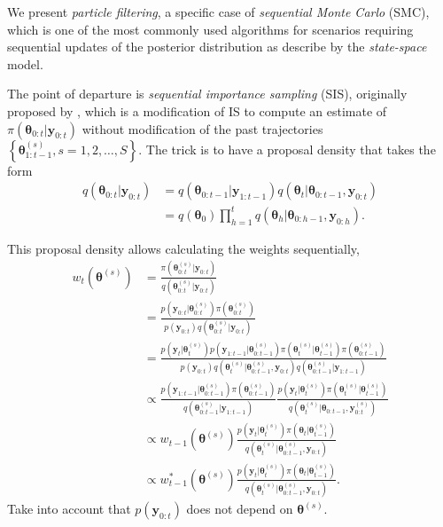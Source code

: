 We present \textit{particle filtering}, a specific case of \textit{sequential Monte Carlo} (SMC), which is one of the most commonly used algorithms for scenarios requiring sequential updates of the posterior distribution as describe by the \textit{state-space} model. 

The point of departure is \textit{sequential importance sampling} (SIS), originally proposed by \cite{handschin1969monte}, which is a modification of IS to compute an estimate of $\pi(\bm{\theta}_{0:t}|\bm{y}_{0:t})$ without modification of the past trajectories $\left\{\bm{\theta}^{(s)}_{1:t-1}, s=1,2,\dots,S\right\}$. The trick is to have a proposal density that takes the form 
\begin{align*}
	q(\bm{\theta}_{0:t}|\bm{y}_{0:t}) &= q(\bm{\theta}_{0:t-1}|\bm{y}_{1:t-1})q(\bm{\theta}_t|\bm{\theta}_{0:t-1},\bm{y}_{0:t}) \\
	&= q(\bm{\theta}_0)\prod_{h=1}^{t}q(\bm{\theta}_h|\bm{\theta}_{0:h-1},\bm{y}_{0:h}).
\end{align*}

This proposal density allows calculating the weights sequentially,
\begin{align*}
	w_{t}(\bm{\theta}^{(s)})&=\frac{\pi(\bm{\theta}_{0:t}^{(s)}|\bm{y}_{0:t})}{q(\bm{\theta}_{0:t}^{(s)}|\bm{y}_{0:t})}\\
	&=\frac{p(\bm{y}_{0:t}|\bm{\theta}_{0:t}^{(s)})\pi(\bm{\theta}_{0:t}^{(s)})}{p(\bm{y}_{0:t})q(\bm{\theta}_{0:t}^{(s)}|\bm{y}_{0:t})}\\
	&=\frac{p(\bm{y}_{t}|\bm{\theta}_{t}^{(s)})p(\bm{y}_{1:t-1}|\bm{\theta}_{0:t-1}^{(s)})\pi(\bm{\theta}_{t}^{(s)}|\bm{\theta}_{t-1}^{(s)})\pi(\bm{\theta}_{0:t-1}^{(s)})}{p(\bm{y}_{0:t})q(\bm{\theta}_{t}^{(s)}|\bm{\theta}_{0:t-1}^{(s)},\bm{y}_{0:t})q(\bm{\theta}_{0:t-1}^{(s)}|\bm{y}_{1:t-1})}\\
	&\propto\frac{p(\bm{y}_{1:t-1}|\bm{\theta}_{0:t-1}^{(s)})\pi(\bm{\theta}_{0:t-1}^{(s)})}{q(\bm{\theta}_{0:t-1}^{(s)}|\bm{y}_{1:t-1})}\frac{p(\bm{y}_{t}|\bm{\theta}_{t}^{(s)})\pi(\bm{\theta}_{t}^{(s)}|\bm{\theta}_{t-1}^{(s)})}{q(\bm{\theta}_{t}^{(s)}|\bm{\theta}_{0:t-1},\bm{y}_{0:t}^{(s)})}\\
	&\propto w_{t-1}(\bm{\theta}^{(s)})\frac{p(\bm{y}_{t}|\bm{\theta}_{t}^{(s)})\pi(\bm{\theta}_{t}|\bm{\theta}_{t-1}^{(s)})}{q(\bm{\theta}_t^{(s)}|\bm{\theta}_{0:t-1}^{(s)},\bm{y}_{0:t})}\\
	&\propto w_{t-1}^*(\bm{\theta}^{(s)})\frac{p(\bm{y}_{t}|\bm{\theta}_{t}^{(s)})\pi(\bm{\theta}_{t}|\bm{\theta}_{t-1}^{(s)})}{q(\bm{\theta}_t^{(s)}|\bm{\theta}_{0:t-1}^{(s)},\bm{y}_{0:t})}.
\end{align*} 
Take into account that $p(\bm{y}_{0:t})$ does not depend on $\bm{\theta}^{(s)}$.


